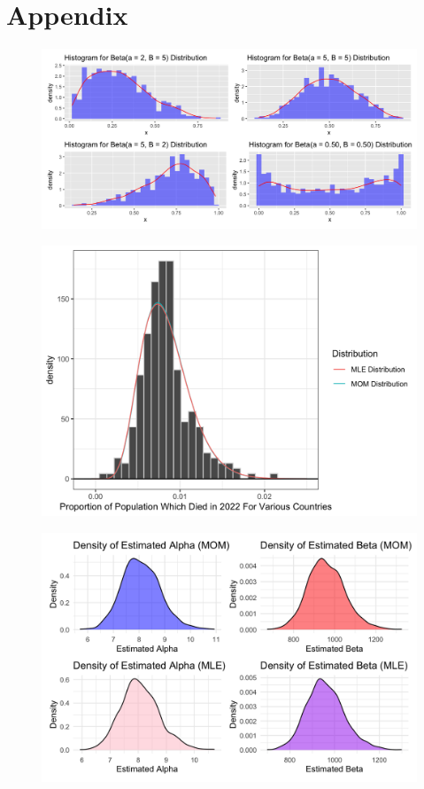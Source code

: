 \documentclass{article}\usepackage[]{graphicx}\usepackage[]{xcolor}
\begin{document}
\onecolumn
\section{Appendix}

\begin{figure}[!htbp]
    \centering
    \includegraphics[width=.75\textwidth]{HHHH}
    \caption{}
    \label{fig:first}
\end{figure}

\begin{figure}[!htbp]
    \centering
    \includegraphics[width=.75\textwidth]{Rplot06.png}
    \caption{}
    \label{fig:second}
\end{figure}

\begin{figure}[!htbp]
    \centering
    \includegraphics[width=.75\textwidth]{Rplot08.png}
    \caption{}
    \label{fig:third}
\end{figure}
\end{document}

